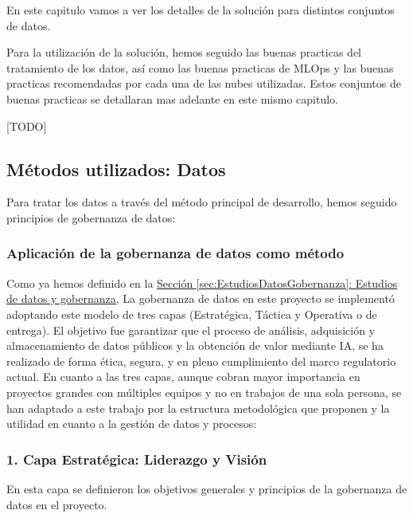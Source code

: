En este capitulo vamos a ver los detalles de la solución para distintos conjuntos de datos. 

Para la utilización de la solución, hemos seguido las buenas practicas del tratamiento de los datos, así como las buenas practicas de MLOps y las buenas practicas recomendadas por cada una de las nubes utilizadas. Estos conjuntos de buenas practicas se detallaran mas adelante en este mismo capitulo.


[TODO]

\subsection{Métodos utilizados: Datos} \label{sec:Metodos_datos}

Para tratar los datos a través del método principal de desarrollo, hemos seguido principios de gobernanza de datos:

\subsubsection{Aplicación de la gobernanza de datos como método}  \label{sec:Metodos_Gobernanza}

Como ya hemos definido en la \hyperref[sec:EstudiosDatosGobernanza]{Sección \ref*{sec:EstudiosDatosGobernanza}: Estudios de datos y gobernanza}, La gobernanza de datos en este proyecto se implementó adoptando este modelo de tres capas (Estratégica, Táctica y Operativa o de entrega). El objetivo fue garantizar que el proceso de análisis, adquisición y almacenamiento de datos públicos y la obtención de valor mediante IA, se ha realizado de forma ética, segura, y en pleno cumplimiento del marco regulatorio actual. En cuanto a las tres capas, aunque cobran mayor importancia en proyectos grandes con múltiples equipos y no en trabajos de una sola persona, se han adaptado a este trabajo por la estructura metodológica que proponen y la utilidad en cuanto a la gestión de datos y procesos:

\subsubsection*{1. Capa Estratégica: Liderazgo y Visión}

En esta capa se definieron los objetivos generales y principios de la gobernanza de datos en el proyecto.

